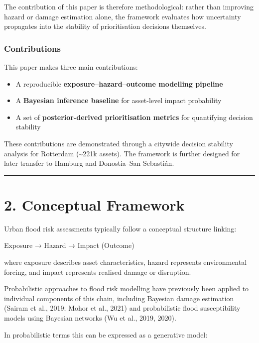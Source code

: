 \documentclass[
]{article}
\providecommand{\tightlist}{%
  \setlength{\itemsep}{0pt}\setlength{\parskip}{0pt}}
\begin{document}
The contribution of this paper is therefore methodological: rather than
improving hazard or damage estimation alone, the framework evaluates how
uncertainty propagates into the stability of prioritisation decisions
themselves.

\subsubsection{Contributions}\label{contributions}

This paper makes three main contributions:

\begin{itemize}
\tightlist
\item
  A reproducible \textbf{exposure--hazard--outcome modelling pipeline}
\item
  A \textbf{Bayesian inference baseline} for asset-level impact
  probability
\item
  A set of \textbf{posterior-derived prioritisation metrics} for
  quantifying decision stability
\end{itemize}

These contributions are demonstrated through a citywide decision
stability analysis for Rotterdam (\textasciitilde221k assets). The
framework is further designed for later transfer to Hamburg and
Donostia--San Sebastián.

\begin{center}\rule{0.5\linewidth}{0.5pt}\end{center}

\section{2. Conceptual Framework}\label{conceptual-framework}

Urban flood risk assessments typically follow a conceptual structure
linking:

Exposure → Hazard → Impact (Outcome)

where exposure describes asset characteristics, hazard represents
environmental forcing, and impact represents realised damage or
disruption.

Probabilistic approaches to flood risk modelling have previously been
applied to individual components of this chain, including Bayesian
damage estimation (Sairam et al., 2019; Mohor et al., 2021) and
probabilistic flood susceptibility models using Bayesian networks (Wu et
al., 2019, 2020).

In probabilistic terms this can be expressed as a generative model:
\end{document}
